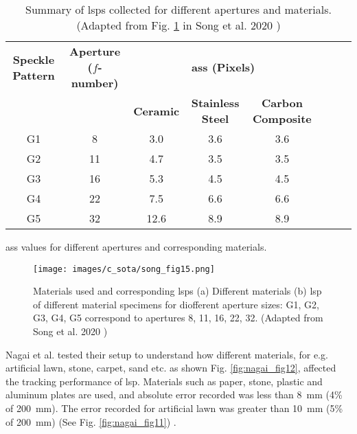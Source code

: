 \begin{table}[h]
        \begin{subtable}{\textwidth}
            \centering
            \footnotesize
            \begin{tabular}{cccccccc}
                \toprule
                \textbf{Speckle Pattern} & \textbf{Aperture ($f$-number)} & \multicolumn{3}{c}{\textbf{\gls{ass} (Pixels)}} \\
                &  & \multicolumn{1}{c}{\textbf{Ceramic}} & \multicolumn{1}{c}{\textbf{Stainless Steel}} & \multicolumn{1}{c}{\textbf{Carbon Composite}} \\
                \midrule
                G1 & 8 & 3.0 & 3.6 & 3.6 \\
                G2 & 11 & 4.7 & 3.5 & 3.5 \\
                G3 & 16 & 5.3 & 4.5 & 4.5 \\
                G4 & 22 & 7.5 & 6.6 & 6.6 \\
                G5 & 32 & 12.6 & 8.9 & 8.9 \\
                \bottomrule
            \end{tabular}
        \caption{\gls{ass} values for different apertures and corresponding materials.}
        \end{subtable}

        \caption{Summary of \glspl{lsp} collected for different apertures and materials. (Adapted from Fig. \ref{fig:song_fig15} in Song et al. 2020 \cite{song})}
        \label{table:song_table_g}
    \end{table}

    \begin{figure}[h]
        \centering
        \texttt{[image: images/c\_sota/song\_fig15.png]}
        \caption{Materials used and corresponding \glspl{lsp} (a) Different materials (b) \gls{lsp} of different material specimens for diofferent aperture sizes: G1, G2, G3, G4, G5 correspond to apertures 8, 11, 16, 22, 32. (Adapted from Song et al. 2020 \cite{song})}
        \label{fig:song_fig15}
    \end{figure}

    \clearpage

    \vspace{5mm}
    \noindent Nagai et al. tested their setup to understand how different materials, for e.g. artificial lawn, stone, carpet, sand etc. as shown Fig. \ref{fig:nagai_fig12}, affected the tracking performance of \gls{lsp}. Materials such as paper, stone, plastic and aluminum plates are used, and absolute error recorded was less than \SI{8}{\milli\meter} (4\% of \SI{200}{\milli\meter}). The error recorded for artificial lawn was greater than \SI{10}{\milli\meter} (5\% of \SI{200}{\milli\meter}) (See Fig. \ref{fig:nagai_fig11}) \cite{nagai}.


